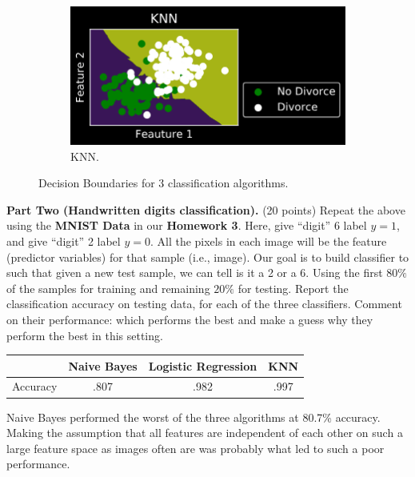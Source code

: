 \documentclass[twoside,10pt]{article}
\begin{document}
\begin{enumerate}
\begin{figure}[h]
\begin{subfigure}[b]{0.3\textwidth}
  \end{subfigure}
  \hfill
  \begin{subfigure}[b]{0.3\textwidth}
    \includegraphics[width=\textwidth]{knn.png}
    \caption{KNN.}
    \label{fig:f3}
  \end{subfigure}
  \caption{Decision Boundaries for 3 classification algorithms.}
\end{figure}


\textbf{Part Two (Handwritten digits classification).} (20 points) Repeat the above using the \textbf{MNIST Data} in our \textbf{Homework 3}. Here, give ``digit'' 6 label $y = 1$, and give ``digit'' 2 label $y = 0$. All the pixels in each image will be the feature (predictor variables) for that sample (i.e., image). Our goal is to build classifier to such that given a new test sample, we can tell is it a 2 or a 6. Using the first $80\%$ of the samples for training and remaining $20\%$ for testing. Report the classification accuracy on testing data, for each of the three classifiers. Comment on their performance: which performs the best and make a guess why they perform the best in this setting.



\begin{table}[h!]
\centering
\begin{tabular}{|| c | c | c | c ||} 
 \hline
  & Naive Bayes & Logistic Regression & KNN  \\ [0.5ex] 
 \hline\hline
 Accuracy & .807 & .982 & .997 \\ 
 \hline
\end{tabular}
\label{table:2}
\end{table}


Naive Bayes performed the worst of the three algorithms at 80.7\% accuracy.  Making the assumption that all features are independent of each other on such a large feature space as images often are was probably what led to such a poor performance.  


\end{enumerate}
\end{document}
